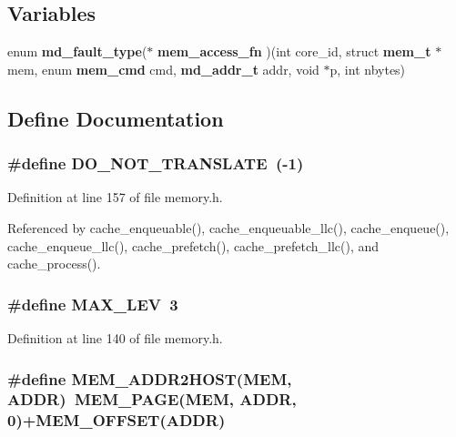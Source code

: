 \subsection*{Variables}
\begin{CompactItemize}
\item 
enum {\bf md\_\-fault\_\-type}($\ast$ {\bf mem\_\-access\_\-fn} )(int core\_\-id, struct {\bf mem\_\-t} $\ast$mem, enum {\bf mem\_\-cmd} cmd, {\bf md\_\-addr\_\-t} addr, void $\ast$p, int nbytes)
\end{CompactItemize}


\subsection{Define Documentation}
\subsubsection[{DO\_\-NOT\_\-TRANSLATE}]{\setlength{\rightskip}{0pt plus 5cm}\#define DO\_\-NOT\_\-TRANSLATE~(-1)}\label{memory_8h_2d833799add0043705e93c62bd718532}




Definition at line 157 of file memory.h.

Referenced by cache\_\-enqueuable(), cache\_\-enqueuable\_\-llc(), cache\_\-enqueue(), cache\_\-enqueue\_\-llc(), cache\_\-prefetch(), cache\_\-prefetch\_\-llc(), and cache\_\-process().
\subsubsection[{MAX\_\-LEV}]{\setlength{\rightskip}{0pt plus 5cm}\#define MAX\_\-LEV~3}\label{memory_8h_af900f23f86c82aca5502edba1f68fcf}




Definition at line 140 of file memory.h.
\subsubsection[{MEM\_\-ADDR2HOST}]{\setlength{\rightskip}{0pt plus 5cm}\#define MEM\_\-ADDR2HOST(MEM, \/  ADDR)~MEM\_\-PAGE(MEM, ADDR, 0)+MEM\_\-OFFSET(ADDR)}\label{memory_8h_f451f14e7eb88fc1bd2df4da94391f29}




